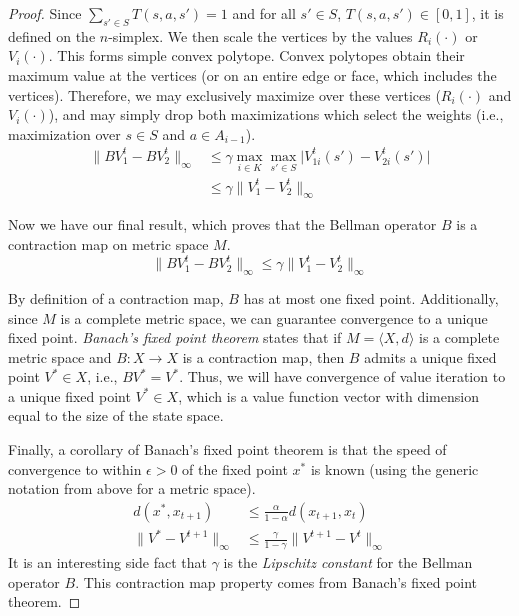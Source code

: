 \begin{proof}
Since $\sum_{s' \in S} T(s, a, s') = 1$ and for all $s' \in S$, $T(s, a, s') \in [0, 1]$, it is defined on the $n$-simplex. We then scale the vertices by the values $R_i(\cdot)$ or $V_i(\cdot)$. This forms simple convex polytope. Convex polytopes obtain their maximum value at the vertices (or on an entire edge or face, which includes the vertices). Therefore, we may exclusively maximize over these vertices ($R_i(\cdot)$ and $V_i(\cdot)$), and may simply drop both maximizations which select the weights (i.e., maximization over $s \in S$ and $a \in A_{i-1}$).
\begin{align*}
    \| B V_1^t - B V_2^t \|_\infty &\leq \gamma \max_{i \in K} \max_{s' \in S} \Big| V_{1i}^t(s') - V_{2i}^t(s') \Big| \\
        &\leq \gamma \| V_1^t - V_2^t \|_\infty
\end{align*}

Now we have our final result, which proves that the Bellman operator $B$ is a contraction map on metric space $M$.
\begin{equation*}
    \| B V_1^t - B V_2^t \|_\infty \leq \gamma \| V_1^t - V_2^t \|_\infty
\end{equation*}

By definition of a contraction map, $B$ has at most one fixed point. Additionally, since $M$ is a complete metric space, we can guarantee convergence to a unique fixed point. \emph{Banach's fixed point theorem} states that if $M = \langle X, d \rangle$ is a complete metric space and $B: X \rightarrow X$ is a contraction map, then $B$ admits a unique fixed point $V^* \in X$, i.e., $B V^* = V^*$. Thus, we will have convergence of value iteration to a unique fixed point $V^* \in X$, which is a value function vector with dimension equal to the size of the state space.

Finally, a corollary of Banach's fixed point theorem is that the speed of convergence to within $\epsilon > 0$ of the fixed point $x^*$ is known (using the generic notation from above for a metric space).
\begin{align*}
    d(x^*, x_{t+1}) &\leq \frac{\alpha}{1 - \alpha} d(x_{t+1}, x_t) \\
    \| V^* - V^{t+1}\|_\infty &\leq \frac{\gamma}{1 - \gamma} \| V^{t+1} - V^t \|_\infty
\end{align*}
It is an interesting side fact that $\gamma$ is the \emph{Lipschitz constant} for the Bellman operator $B$. This contraction map property comes from Banach's fixed point theorem.


\end{proof}
